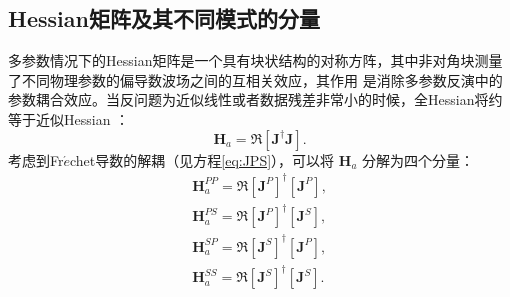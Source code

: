 \subsection{Hessian矩阵及其不同模式的分量}
多参数情况下的Hessian矩阵是一个具有块状结构的对称方阵，其中非对角块测量了不同物理参数的偏导数波场之间的互相关效应，其作用
是消除多参数反演中的参数耦合效应。当反问题为近似线性或者数据残差非常小的时候，全Hessian将约等于近似Hessian
\cite[]{pratt1998gauss}：
\begin{equation}
\mathbf{H}_a =\mathfrak{R}[{\mathbf{J}}^{\dagger}\mathbf{J}]. 
\label{eq:hess}
\end{equation}
考虑到Fr{$\acute{e}$}chet导数的解耦（见方程\ref{eq:JPS}），可以将 $\mathbf{H}_a$ 分解为四个分量：
\begin{equation}
\begin{split}
\mathbf{H}_a^{PP}=\mathfrak{R}[{\mathbf{J}^{P}}]^{\dagger}[{\mathbf{J}^{P}}],\\
\mathbf{H}_a^{PS}=\mathfrak{R}[{\mathbf{J}^{P}}]^{\dagger}[{\mathbf{J}^{S}}],\\
\mathbf{H}_a^{SP}=\mathfrak{R}[{\mathbf{J}^{S}}]^{\dagger}[{\mathbf{J}^{P}}],\\
\mathbf{H}_a^{SS}=\mathfrak{R}[{\mathbf{J}^{S}}]^{\dagger}[{\mathbf{J}^{S}}].
\end{split}
\label{eq:hessian_component}
\end{equation}

